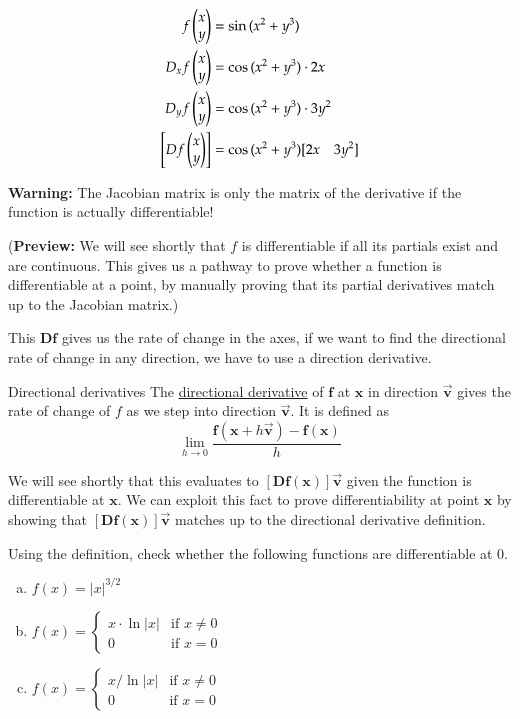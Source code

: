 \example
\begin{align*}
  f\begin{pmatrix} x \\ y \end{pmatrix} &= \sin{(x^2+y^3)} \\
  D_x f\begin{pmatrix} x \\ y \end{pmatrix} &= \cos{(x^2 + y^3)}\cdot 2x \\
  D_y f\begin{pmatrix} x \\ y \end{pmatrix} &= \cos{(x^2 + y^3)}\cdot 3y^2 \\
  \left[Df\begin{pmatrix} x \\ y \end{pmatrix}\right] &= \cos{(x^2 + y^3) [2x \quad 3y^2]}
\end{align*}

\textbf{Warning:} The Jacobian matrix is only the matrix of the derivative if the function is actually differentiable!

(\textbf{Preview:} We will see shortly that $f$ is differentiable if all its partials exist and are continuous. This gives us a pathway to prove whether a function is differentiable at a point, by manually proving that its partial derivatives match up to the Jacobian matrix.)

This $\bm{Df}$ gives us the rate of change in the axes, if we want to find the directional rate of change in any direction, we have to use a direction derivative.

\begin{defn}{Directional derivatives}
The \ul{directional derivative} of $\bm{f}$ at $\bm{x}$ in direction $\vec{\bm{v}}$ gives the rate of change of $f$ as we step into direction $\vec{\bm{v}}$. It is defined as
\begin{equation}
	\lim_{h\to 0}\frac{\bm{f}(\bm{x}+h\vec{\bm{v}})-\bm{f}(\bm{x})}{h}
\end{equation}
\end{defn}

We will see shortly that this evaluates to $[\bm{Df}(\bm{x})]\vec{\bm{v}}$ given the function is differentiable at $\bm{x}$. We can exploit this fact to prove differentiability at point $\bm{x}$ by showing that $[\bm{Df}(\bm{x})]\vec{\bm{v}}$ matches up to the directional derivative definition. 

 Using the definition, check whether the following functions are differentiable at 0.
\begin{enumerate}[a.]
  \item $f(x) = |x|^{3/2}$ \\
  \item $\displaystyle f(x) = \begin{cases}x \cdot \ln{|x|} & \text{if } x \neq 0 \\ 0 & \text{if } x = 0 \end{cases}$ \\
  \item $\displaystyle f(x) = \begin{cases}x/ \ln{|x|} & \text{if } x \neq 0 \\ 0 & \text{if } x = 0\end{cases}$ \\
\end{enumerate}
